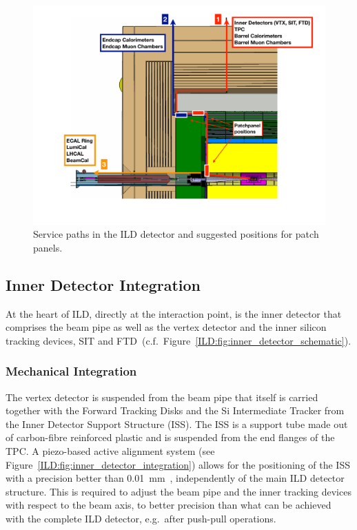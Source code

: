 \begin{figure}[h!]
    \centering
    \includegraphics[width=1.0\hsize]{Integration/fig/cable_paths_new.pdf}
    \caption{Service paths in the ILD detector and suggested positions for patch panels.}
    \label{ILD:fig:cable_paths}
\end{figure}


\subsection{Inner Detector Integration}

At the heart of ILD, directly at the interaction point, is the inner detector that comprises the beam pipe as well as the vertex detector and the inner silicon tracking devices, SIT and FTD~(c.f.~Figure~\ref{ILD:fig:inner_detector_schematic}).

\subsubsection{Mechanical Integration}
The vertex detector is suspended from the beam pipe that itself is carried together with the Forward Tracking Disks and the Si Intermediate Tracker from the Inner Detector Support Structure (ISS). The ISS is a support tube made out of carbon-fibre reinforced plastic and is suspended from the end flanges of the TPC. A piezo-based active alignment system (see Figure~\ref{ILD:fig:inner_detector_integration}) allows for the positioning of the ISS with a precision better than 0.01~mm~\cite{ild:bib:inner_detector_integration}, independently of the main ILD detector structure. This is required to adjust the beam pipe and the inner tracking devices with respect to the beam axis, to better precision than what can be achieved with the complete ILD detector, e.g.~after push-pull operations.

